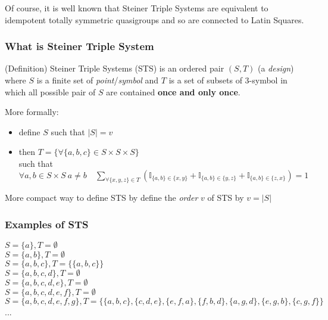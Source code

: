 	Of course, it is well known that Steiner Triple Systems are equivalent to idempotent totally symmetric quasigroups and so are connected to Latin Squares.
	\begin{frame}
		\frametitle{What is Steiner Triple System }
		\begin{block}{(Definition) Steiner Triple Systems (STS)}
			is an ordered pair $(S,T)$ (a \textit{design}) where $S$ is a finite set of \textit{point}/\textit{symbol} and $T$ is a set of subsets of 3-symbol in which all possible pair of $S$ are contained \textbf{once and only once}.\\
			 
		\end{block}
	
	\pause
	
	More formally:\\
	\begin{itemize}
		\item define $S$ such that $|S|=v$
		\item 	then $T = \{ \forall \{a,b,c\} \in S\times S \times S\}$\\
		 such that $\forall a,b \in S \times S \ a \not = b  \quad \sum_{ \forall \{x,y,z\} \in T} (\mathbb{I}_{ \{ a,b \} \in \{x,y\} }  + \mathbb{I}_{ \{ a,b \} \in \{y,z\} } +\mathbb{I}_{ \{ a,b \} \in \{z,x\}  }) = 1 $
	\end{itemize}
	More compact way to define STS by define the \textit{order} $v$ of STS by $v = |S|$
	\end{frame}

	
	
	\begin{frame}
		\frametitle{Examples of STS}
		\begin{center}
			$S=\{a\}, T= \emptyset$\\
			$S=\{a,b\}, T= \emptyset$\\
			$S=\{a,b,c\}, T= \{ \{a,b,c\} \}$\\
			$S=\{a,b,c,d\}, T=\emptyset$\\
			$S=\{a,b,c,d,e\}, T= \emptyset$\\
			$S=\{a,b,c,d,e,f\}, T= \emptyset$\\
			$S=\{a,b,c,d,e,f,g\}, T= \{ \{a,b,c\},\{c,d,e\},\{e,f,a\},\{f,b,d\},\{a,g,d\},\{e,g,b\},\{c,g,f\} \}$\\
			...
		\end{center}
	\end{frame}

